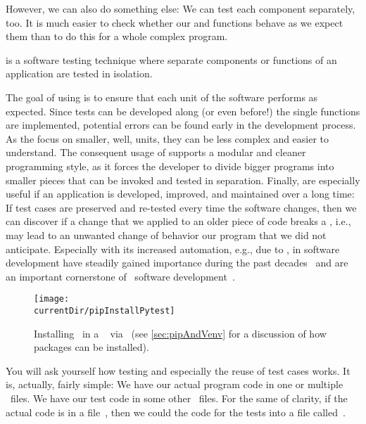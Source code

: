 However, we can also do something else:
We can test each component separately, too.
It is much easier to check whether our  and  functions behave as we expect them than to do this for a whole complex program.%
%
\begin{definition}
\label{def:unitTesting}%
 is a software testing technique where separate components or functions of an application are tested in isolation.
\end{definition}%
%
The goal of using  is to ensure that each unit of the software performs as expected.
Since tests can be developed along (or even before!) the single functions are implemented, potential errors can be found early in the development process.
As the  focus on smaller, well, units, they can be less complex and easier to understand.
The consequent usage of  supports a modular and cleaner programming style, as it forces the developer to divide bigger programs into smaller pieces that can be invoked and tested in separation.
Finally,  are especially useful if an application is developed, improved, and maintained over a long time:
If test cases are preserved and re-tested every time the software changes, then we can discover if a change that we applied to an older piece of code breaks a , i.e., may lead to an unwanted change of behavior our program that we did not anticipate.
Especially with its increased automation, e.g., due to ,  in software development have steadily gained importance during the past decades~\cite{W2000WISTAWIISH,TLG2006UTCU,R2006ASOUTP} and are an important cornerstone of \python\ software development~\cite{P2021PUTAAOAEUTIP,O2022PTWP,DG2020TIP}.%
%
%
\begin{figure}%
\centering%
\texttt{[image: \\currentDir/pipInstallPytest]}%
\caption{Installing \pytest\ in a \ubuntu\  via \pip~(see \cref{sec:pipAndVenv} for a discussion of how packages can be installed).}%
\label{fig:pipInstallPytest}%
\end{figure}%
%
%
%
You will ask yourself how testing and especially the reuse of test cases works.
It is, actually, fairly simple:
We have our actual program code in one or multiple \python\ files.
We have our test code in some other \python\ files.
For the same of clarity, if the actual code is in a file~, then we could the code for the tests into a file called~.

